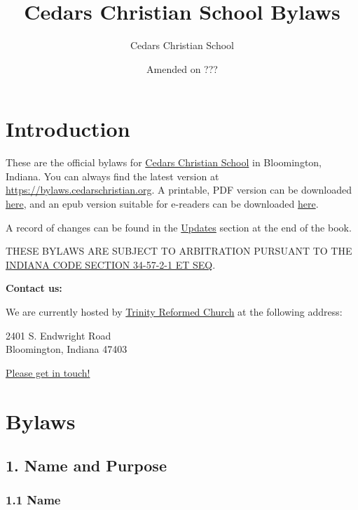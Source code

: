 \documentclass[
]{book}
\title{Cedars Christian School Bylaws}
\author{Cedars Christian School}
\date{Amended on ???}
\begin{document}
\maketitle

{
\hypersetup{linkcolor=}
\setcounter{tocdepth}{1}
\tableofcontents
}
\chapter*{Introduction}\label{introduction}

These are the official bylaws for \href{https://cedarschristian.org}{Cedars Christian School} in Bloomington, Indiana. You can always find the latest version at \url{https://bylaws.cedarschristian.org}. A printable, PDF version can be downloaded \href{ccs-bylaws.pdf}{here}, and an epub version suitable for e-readers can be downloaded \href{ccs-bylaws.epub}{here}.

A record of changes can be found in the \href{updates.html}{Updates} section at the end of the book.

THESE BYLAWS ARE SUBJECT TO ARBITRATION PURSUANT TO THE \href{https://iga.in.gov/legislative/laws/2022/ic/titles/034\#34-57-2-1}{INDIANA CODE SECTION 34-57-2-1 ET SEQ}.

\textbf{Contact us:}

We are currently hosted by \href{https://trinityreformed.org}{Trinity Reformed Church} at the following address:

2401 S. Endwright Road\\
Bloomington, Indiana 47403

\href{https://cedarschristian.org/contact-us/}{Please get in touch!}

\mainmatter

\chapter*{Bylaws}\label{bylaws}

\section*{1. Name and Purpose}\label{name-and-purpose}

\subsection*{1.1 Name}\label{name}
\end{document}
